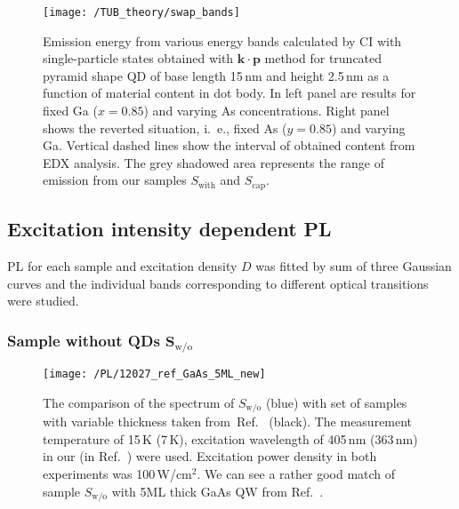 \begin{figure}
	\centering
	\texttt{[image: /TUB\_theory/swap\_bands]}
	\caption{Emission energy from various energy bands calculated by CI with single-particle states obtained with $\mathbf{k \cdot p}$ method for truncated pyramid shape QD of base length 15$\,$nm and height 2.5$\,$nm as a function of material content in dot body. In left panel are results for fixed Ga ($x=0.85$) and varying As concentrations. Right panel shows the reverted situation, i.~e., fixed As ($y=0.85$) and varying Ga. Vertical dashed lines show the interval of obtained content from EDX analysis. The grey shadowed area represents the range of emission from our samples $S_\mathrm{with}$ and $S_\mathrm{cap}$.}
	\label{fig:Gamma_L_reverse}
\end{figure}
	


\subsection{Excitation intensity dependent PL}
\label{sec:intensity_PL_TU}
PL for each sample and excitation density $D$ was fitted by sum of three Gaussian curves and the individual bands corresponding to different optical transitions were studied. 

\subsubsection*{Sample without QDs $\mathbf{S_\mathrm{w/o}}$}
\label{Sec:PL_int_wo}
\begin{figure}
	\centering
	\texttt{[image: /PL/12027\_ref\_GaAs\_5ML\_new]}
	\caption{The comparison of the spectrum of $S_\mathrm{w/o}$ (blue) with set of samples with variable thickness taken from~Ref.~\citep{Prieto_APL1997} (black). The measurement temperature of 15$\,$K (7$\,$K), excitation wavelength of 405$\,$nm (363$\,$nm) in our (in Ref.~\citep{Prieto_APL1997}) were used. Excitation power density in both experiments was 100$\,$W/cm$^2$. We can see a rather good match of sample $S_\mathrm{w/o}$ with 5ML thick GaAs QW from Ref.~\citep{Prieto_APL1997}.}
	\label{fig:12027_ref}
\end{figure}


